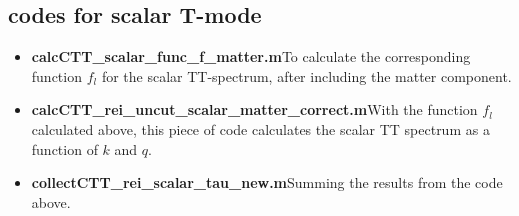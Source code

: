 \documentclass[12pt]{article}
\begin{document}
\subsection*{codes for scalar T-mode}
\begin{itemize}\itemsep0em
\item {\bf calcCTT\_scalar\_func\_f\_matter.m}\quad To calculate the corresponding function $f_l$ for the scalar TT-spectrum, after including the matter component.
\item {\bf calcCTT\_rei\_uncut\_scalar\_matter\_correct.m}\quad With the function $f_l$ calculated above, this piece of code calculates the scalar TT spectrum as a function of $k$ and $q$.
\item {\bf collectCTT\_rei\_scalar\_tau\_new.m}\quad Summing the results from the code above.
\end{itemize}

%
%
\end{document}
